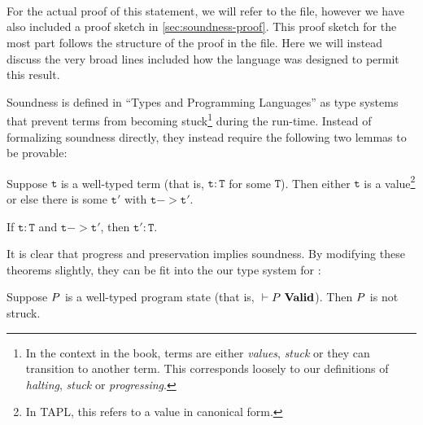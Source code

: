 \begin{code}
\> \AgdaSymbol{:}  \AgdaSymbol{\{}  \AgdaSymbol{\}} \<%
\\
\>[2]\<[20]%
\>[20]   \<%
\\
\>[2]\<[20]%
\>[20]    \AgdaFunction{/}  \<%
\\
\>[2]\<[20]%
\>[20] \<%
\end{code}

For the actual proof of this statement, we will refer to the file, however we
have also included a proof sketch in \cref{sec:soundness-proof}. This proof
sketch for the most part follows the structure of the proof in the file. Here we
will instead discuss the very broad lines included how the language was designed
to permit this result.

Soundness is defined in ``Types and Programming Languages''\cite{typesandprog}
as type systems that prevent terms from becoming stuck\footnote{In the context
  in the book, terms are either \emph{values}, \emph{stuck} or they can
  transition to another term. This corresponds loosely to our definitions of
  \emph{halting}, \emph{stuck} or \emph{progressing}.} during the
run-time. Instead of formalizing soundness directly, they instead require the
following two lemmas to be provable:

\begin{theorem}[Progress]
  Suppose $\mathtt{t}$ is a well-typed term (that is, $\mathtt{t} : \mathtt{T}$
  for some $\mathtt{T}$). Then either $\mathtt{t}$ is a value\footnote{In TAPL,
    this refers to a value in canonical form.} or else there is some
  $\mathtt{t'}$ with $\mathtt{t} -> \mathtt{t'}$.
\end{theorem}

\begin{theorem}[Preservation]
  If $\mathtt{t} : \mathtt{T}$ and $\mathtt{t} -> \mathtt{t'}$, then
  $\mathtt{t'} : \mathtt{T}$.
\end{theorem}

It is clear that progress and preservation implies soundness. By modifying these
theorems slightly, they can be fit into the our type system for \ATAL:

\begin{theorem}
  \label{lemma:atalprogress}
  Suppose $P$ is a well-typed program state (that is,
  ${} |- {P}\ \mathbf{Valid}$). Then $P$ is not struck.
\end{theorem}


